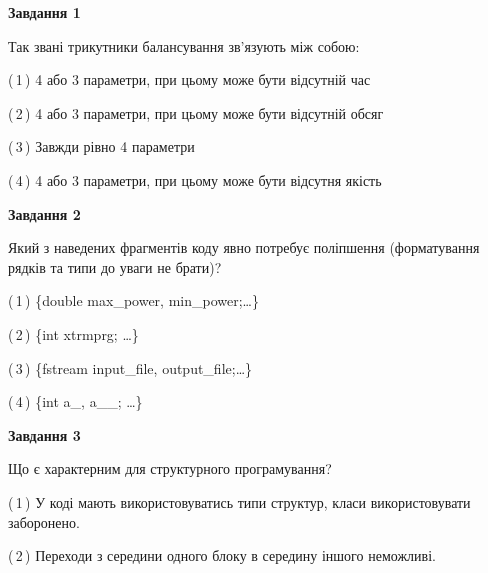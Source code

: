 \documentclass[10pt, ukrainian]{article}
\begin{document}
{
\begin {large}
{\begin {center}\textbf{Завдання 1}\end {center}}\par
Так звані трикутники балансування зв'язують між собою:\par
\vspace{2mm}



(\,1\,) 4 або 3 параметри, при цьому може бути відсутній час%



(\,2\,) 4 або 3 параметри, при цьому може бути відсутній обсяг %



(\,3\,) Завжди рівно 4 параметри%



(\,4\,) 4 або 3 параметри, при цьому може бути відсутня якість%


{\begin {center}\textbf{Завдання 2}\end {center}}\par
Який з наведених фрагментів коду явно потребує поліпшення (форматування рядків та типи до уваги не брати)?\par
\vspace{2mm}



(\,1\,) \{double max\_power, min\_power;…\} %



(\,2\,) \{int xtrmprg; …\}%



(\,3\,) \{fstream input\_file, output\_file;…\} %



(\,4\,) \{int a\_, a\_\_; …\}%


{\begin {center}\textbf{Завдання 3}\end {center}}\par
Що є характерним для структурного програмування?\par
\vspace{2mm}



(\,1\,) У коді мають використовуватись типи структур, класи використовувати заборонено. %



(\,2\,) Переходи з середини одного блоку в середину іншого неможливі. %




\end{large}}
\end{document}
